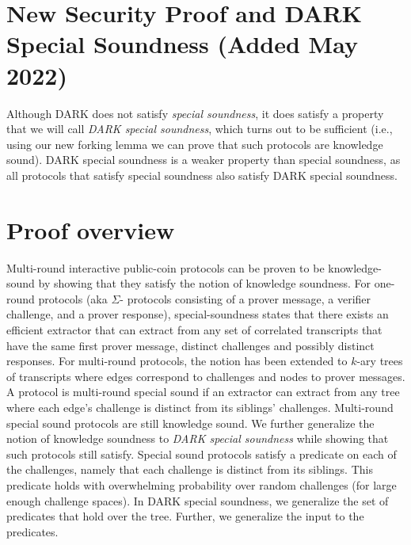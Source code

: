 \clearpage
\section*{New Security Proof and DARK Special Soundness (Added May 2022)}

\label{appendix:proofs}

Although DARK does not satisfy \emph{special soundness}, it does satisfy a property that we will call \emph{DARK special soundness}, which turns out to be sufficient (i.e., using our new forking lemma we can prove that such protocols are knowledge sound). DARK special soundness is a weaker property than special soundness, as all protocols that satisfy special soundness also satisfy DARK special soundness. 
\section{Proof overview}
Multi-round interactive public-coin protocols can be proven to be knowledge-sound by showing that they satisfy the notion of knowledge soundness. For one-round protocols (aka $\Sigma$- protocols consisting of a prover message, a verifier challenge, and a prover response), special-soundness states that there exists an efficient extractor that can extract from any set of correlated transcripts that have the same first prover message, distinct challenges and possibly distinct responses. For multi-round protocols, the notion has been extended to $k$-ary trees of transcripts where edges correspond to challenges and nodes to prover messages. A protocol is multi-round special sound if an extractor can extract from any tree where each edge's challenge is distinct from its siblings' challenges. Multi-round special sound protocols are still knowledge sound. We further generalize the notion of knowledge soundness to \emph{DARK special soundness} while showing that such protocols still satisfy. Special sound protocols satisfy a predicate on each of the challenges, namely that each challenge is distinct from its siblings. This predicate holds with overwhelming probability over random challenges (for large enough challenge spaces). In DARK special soundness, we generalize the set of predicates that hold over the tree. Further, we generalize the input to the predicates. 


